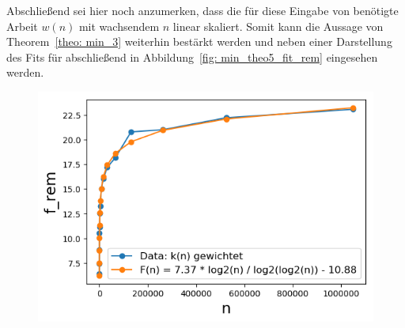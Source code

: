 \noindent
Abschließend sei hier noch anzumerken, dass die für diese Eingabe von \Rm benötigte Arbeit $w(n)$ mit wachsendem $n$ linear skaliert. Somit kann die Aussage von Theorem~\ref{theo: min_3} weiterhin bestärkt werden und neben einer Darstellung des Fits für \fgr abschließend in Abbildung~\ref{fig: min_theo5_fit_rem} eingesehen werden. 

\begin{figure}[H]
	\hspace*{-1.1cm}
    \begin{minipage}[t]{.30\textwidth}
        \centering
    \end{minipage}
    \hspace*{.6cm}
    \begin{minipage}[t]{.30\textwidth}
        \centering
        \includegraphics[width=1.2\textwidth]{pictures/min_theo5_rem_weigh_fit.png}

\end{minipage}
\end{figure}
